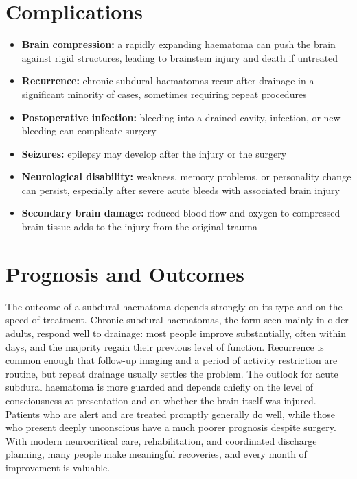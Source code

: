 \section*{Complications}
\begin{itemize}
    \item \textbf{Brain compression:} a rapidly expanding haematoma can push the brain against rigid structures, leading to brainstem injury and death if untreated
    \item \textbf{Recurrence:} chronic subdural haematomas recur after drainage in a significant minority of cases, sometimes requiring repeat procedures
    \item \textbf{Postoperative infection:} bleeding into a drained cavity, infection, or new bleeding can complicate surgery
    \item \textbf{Seizures:} epilepsy may develop after the injury or the surgery
    \item \textbf{Neurological disability:} weakness, memory problems, or personality change can persist, especially after severe acute bleeds with associated brain injury
    \item \textbf{Secondary brain damage:} reduced blood flow and oxygen to compressed brain tissue adds to the injury from the original trauma
\end{itemize}

\section*{Prognosis and Outcomes}
The outcome of a subdural haematoma depends strongly on its type and on the speed of treatment. Chronic subdural haematomas, the form seen mainly in older adults, respond well to drainage: most people improve substantially, often within days, and the majority regain their previous level of function. Recurrence is common enough that follow-up imaging and a period of activity restriction are routine, but repeat drainage usually settles the problem. The outlook for acute subdural haematoma is more guarded and depends chiefly on the level of consciousness at presentation and on whether the brain itself was injured. Patients who are alert and are treated promptly generally do well, while those who present deeply unconscious have a much poorer prognosis despite surgery. With modern neurocritical care, rehabilitation, and coordinated discharge planning, many people make meaningful recoveries, and every month of improvement is valuable.

